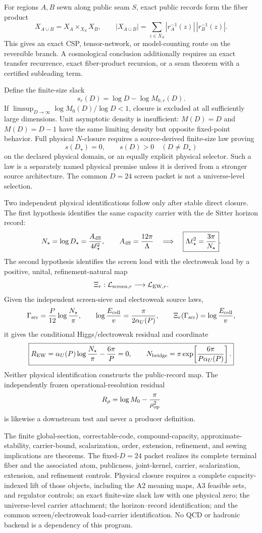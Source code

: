 For regions \(A,B\) sewn along public seam \(S\), exact public records form
the fiber product
\[
X_{A\cup B}=X_A\times_{X_S}X_B,
\qquad
|X_{A\cup B}|=
\sum_{z\in X_S}|r_A^{-1}(z)|\,|r_B^{-1}(z)|.
\]
This gives an exact CSP, tensor-network, or model-counting route on the
reversible branch. A cosmological conclusion additionally requires an exact
transfer recurrence, exact fiber-product recursion, or a seam theorem with a
certified subleading term.

Define the finite-size slack
\[
\boxed{s_r(D)=\log D-\log M_{0,r}(D).}
\]
If \(\limsup_{D\to\infty}\log M_0(D)/\log D<1\), closure is excluded at all
sufficiently large dimensions. Unit asymptotic density is insufficient:
\(M(D)=D\) and \(M(D)=D-1\) have the same limiting density but opposite
fixed-point behavior. Full physical \(N\)-closure requires a source-derived
finite-size law proving
\[
s(D_\star)=0,
\qquad s(D)>0\quad(D\ne D_\star)
\]
on the declared physical domain, or an equally explicit physical selector.
Such a law is a separately named physical premise unless it is derived from a
stronger source architecture. The common \(D=24\) screen packet is not a
universe-level selection.

Two independent physical identifications follow only after stable direct
closure. The first hypothesis identifies the same capacity carrier with the
de Sitter horizon record:
\[
N_\star=\log D_\star=\frac{A_{\rm dS}}{4\ell_\star^2},
\qquad
A_{\rm dS}=\frac{12\pi}{\Lambda}
\quad\Longrightarrow\quad
\boxed{\Lambda\ell_\star^2=\frac{3\pi}{N_\star}}.
\]
The second hypothesis identifies the screen load with the electroweak load by
a positive, unital, refinement-natural map
\[
\Xi_r:\mathcal L_{{\rm screen},r}\longrightarrow
\mathcal L_{{\rm EW},r}.
\]
Given the independent screen-sieve and electroweak source laws,
\[
\Gamma_{\rm scr}=\frac{P}{12}\log\frac{N_\star}{\pi},
\qquad
\log\frac{E_{\rm cell}}v=\frac{\pi}{2\alpha_U(P)},
\qquad
\Xi_r(\Gamma_{\rm scr})=\log\frac{E_{\rm cell}}v,
\]
it gives the conditional Higgs/electroweak residual and coordinate
\[
\boxed{
R_{\rm EW}=
\alpha_U(P)\log\frac{N_\star}{\pi}-\frac{6\pi}{P}=0,
\qquad
N_{\rm bridge}=
\pi\exp\!\left[\frac{6\pi}{P\alpha_U(P)}\right].
}
\]
Neither physical identification constructs the public-record map. The
independently frozen operational-resolution residual
\[
R_\rho=\log M_0-\frac{\pi}{\rho_{\rm op}^2}
\]
is likewise a downstream test and never a producer definition.

The finite global-section, correctable-code, compound-capacity,
approximate-stability, carrier-bound, scalarization, order, extension,
refinement, and sewing implications are theorems. The fixed-\(D=24\) packet
realizes its complete terminal fiber and the associated atom, publicness,
joint-kernel, carrier, scalarization, extension, and refinement controls.
Physical closure requires a complete capacity-indexed lift of those objects,
including the A2 meaning maps, A3 feasible sets, and regulator controls; an
exact finite-size slack law with one physical zero; the universe-level
carrier attachment; the horizon--record identification; and the common
screen/electroweak load-carrier identification.
No QCD or hadronic backend is a dependency of this program.
